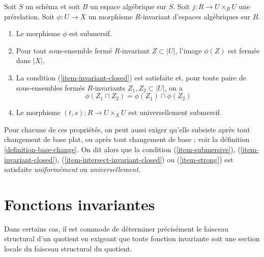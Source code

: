 \begin{definition}
\label{definition-topological}
Soit $S$ un schéma et soit $B$ un espace algébrique sur $S$.
Soit $j : R \to U \times_B U$ une prérelation.
Soit $\phi : U \to X$ un morphisme $R$-invariant d'espaces algébriques sur $B$.
\begin{enumerate}
\item
\label{item-submersive}
Le morphisme $\phi$ est submersif.
\item
\label{item-invariant-closed}
Pour tout sous-ensemble fermé $R$-invariant $Z \subset |U|$, l'image
$\phi(Z)$ est fermée dans $|X|$.
\item
\label{item-intersect-invariant-closed}
La condition (\ref{item-invariant-closed}) est satisfaite et, pour toute paire de
sous-ensembles fermés $R$-invariants $Z_1, Z_2 \subset |U|$, on a
$$
\phi(Z_1 \cap Z_2) = \phi(Z_1) \cap \phi(Z_2)
$$
\item Le morphisme $(t, s) : R \to U \times_X U$ est universellement submersif.
\label{item-strong}
\end{enumerate}
Pour chacune de ces propriétés, on peut aussi exiger qu'elle subsiste après tout
changement de base plat, ou après tout changement de base ; voir la
définition \ref{definition-base-change}. On dit alors que la condition
(\ref{item-submersive}),
(\ref{item-invariant-closed}),
(\ref{item-intersect-invariant-closed}) ou
(\ref{item-strong}) est satisfaite {\it uniformément} ou {\it universellement}.
\end{definition}









\section{Fonctions invariantes}
\label{section-functions}

\noindent
Dans certains cas, il est commode de déterminer précisément le faisceau structural
d'un quotient en exigeant que toute fonction invariante soit une section locale
du faisceau structural du quotient.

